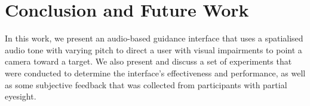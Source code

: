 \documentclass[sigconf, screen=true, anonymous=true]{acmart}
\begin{document}




\section{Conclusion and Future Work}\label{sec:conclusion}

In this work, we present an audio-based guidance interface that uses a spatialised audio tone with varying pitch to direct a user with visual impairments to point a camera toward a target. 
We also present and discuss a set of experiments that were conducted  to determine the interface's effectiveness and performance, as well as some subjective feedback that was collected from participants with partial eyesight. 
\end{document}

